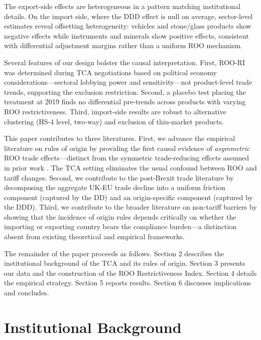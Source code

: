 \documentclass[12pt]{article}
\begin{document}
The export-side effects are heterogeneous in a pattern matching institutional details. On the import side, where the DDD effect is null on average, sector-level estimates reveal offsetting heterogeneity: vehicles and stone/glass products show negative effects while instruments and minerals show positive effects, consistent with differential adjustment margins rather than a uniform ROO mechanism.

Several features of our design bolster the causal interpretation. First, ROO-RI was determined during TCA negotiations based on political economy considerations---sectoral lobbying power and sensitivity---not product-level trade trends, supporting the exclusion restriction. Second, a placebo test placing the treatment at 2019 finds no differential pre-trends across products with varying ROO restrictiveness. Third, import-side results are robust to alternative clustering (HS-4 level, two-way) and exclusion of thin-market products.

This paper contributes to three literatures. First, we advance the empirical literature on rules of origin by providing the first causal evidence of \textit{asymmetric} ROO trade effects---distinct from the symmetric trade-reducing effects assumed in prior work \citep{cadot2006, estevadeordal2000, conconi2018}. The TCA setting eliminates the usual confound between ROO and tariff changes. Second, we contribute to the post-Brexit trade literature \citep{dhingra2022, freeman2022, crowley2022, breinlich2022} by decomposing the aggregate UK-EU trade decline into a uniform friction component (captured by the DD) and an origin-specific component (captured by the DDD). Third, we contribute to the broader literature on non-tariff barriers \citep{anderson2004, head2014} by showing that the incidence of origin rules depends critically on whether the importing or exporting country bears the compliance burden---a distinction absent from existing theoretical and empirical frameworks.

The remainder of the paper proceeds as follows. Section 2 describes the institutional background of the TCA and its rules of origin. Section 3 presents our data and the construction of the ROO Restrictiveness Index. Section 4 details the empirical strategy. Section 5 reports results. Section 6 discusses implications and concludes.


\section{Institutional Background}
\end{document}
